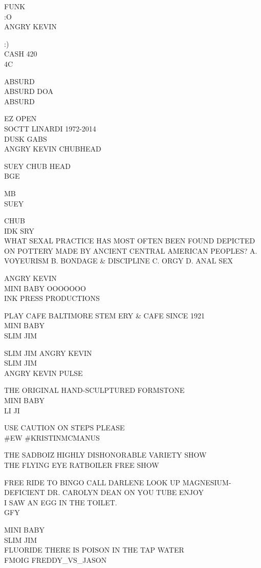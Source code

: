 \documentclass[10pt,letterpaper]{article}
\begin{document}
FUNK\\
:O\\
ANGRY KEVIN

:)\\
CASH 420\\
4C

ABSURD\\
ABSURD DOA\\
ABSURD

EZ OPEN\\
SOCTT LINARDI 1972{-}2014\\
DUSK GABS\\
ANGRY KEVIN CHUBHEAD

SUEY CHUB HEAD\\
BGE

MB\\
SUEY

CHUB\\
IDK SRY\\
WHAT SEXAL PRACTICE HAS MOST OFTEN BEEN FOUND DEPICTED ON POTTERY MADE BY ANCIENT CENTRAL AMERICAN PEOPLES?  A. VOYEURISM B. BONDAGE \& DISCIPLINE C. ORGY D. ANAL SEX

ANGRY KEVIN\\
MINI BABY OOOOOOO\\
INK PRESS PRODUCTIONS

PLAY CAFE BALTIMORE STEM ERY \& CAFE SINCE 1921\\
MINI BABY\\
SLIM JIM

SLIM JIM ANGRY KEVIN\\
SLIM JIM\\
ANGRY KEVIN PULSE

THE ORIGINAL HAND{-}SCULPTURED FORMSTONE\\
MINI BABY\\
LI JI

USE CAUTION ON STEPS PLEASE\\
\#EW \#KRISTINMCMANUS

THE SADBOIZ HIGHLY DISHONORABLE VARIETY SHOW\\
THE FLYING EYE RATBOILER FREE SHOW

FREE RIDE TO BINGO CALL DARLENE LOOK UP MAGNESIUM{-}DEFICIENT DR. CAROLYN DEAN ON YOU TUBE ENJOY\\
I SAW AN EGG IN THE TOILET.\\
GFY

MINI BABY\\
SLIM JIM\\
FLUORIDE THERE IS POISON IN THE TAP WATER\\
FMOIG FREDDY\_VS\_JASON
\end{document}
